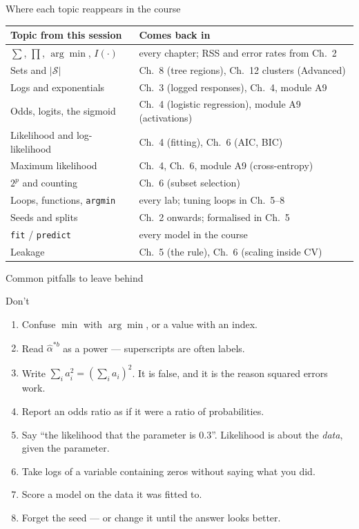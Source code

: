 \documentclass[aspectratio=169,11pt]{beamer}
\begin{document}
\begin{frame}{Where each topic reappears in the course}
  \footnotesize
  \begin{center}
  \begin{tabular}{@{}ll@{}}
    \toprule
    \textbf{Topic from this session} & \textbf{Comes back in} \\
    \midrule
    $\sum$, $\prod$, $\arg\min$, $I(\cdot)$ & every chapter; RSS and error rates from Ch.\ 2 \\
    Sets and $|\mathcal{S}|$ & Ch.\ 8 (tree regions), Ch.\ 12 clusters (Advanced) \\
    Logs and exponentials & Ch.\ 3 (logged responses), Ch.\ 4, module A9 \\
    Odds, logits, the sigmoid & Ch.\ 4 (logistic regression), module A9 (activations) \\
    Likelihood and log-likelihood & Ch.\ 4 (fitting), Ch.\ 6 (AIC, BIC) \\
    Maximum likelihood & Ch.\ 4, Ch.\ 6, module A9 (cross-entropy) \\
    $2^p$ and counting & Ch.\ 6 (subset selection) \\
    Loops, functions, \texttt{argmin} & every lab; tuning loops in Ch.\ 5--8 \\
    Seeds and splits & Ch.\ 2 onwards; formalised in Ch.\ 5 \\
    \texttt{fit} / \texttt{predict} & every model in the course \\
    Leakage & Ch.\ 5 (the rule), Ch.\ 6 (scaling inside CV) \\
    \bottomrule
  \end{tabular}
  \end{center}
\end{frame}

\begin{frame}{Common pitfalls to leave behind}
  \begin{alertblock}{Don't}
    \begin{enumerate}
      \item Confuse $\min$ with $\arg\min$, or a value with an index.
      \item Read $\hat\alpha^{*b}$ as a power --- superscripts are often labels.
      \item Write $\sum_i a_i^2 = (\sum_i a_i)^2$. It is false, and it is the
            reason squared errors work.
      \item Report an odds ratio as if it were a ratio of probabilities.
      \item Say ``the likelihood that the parameter is $0.3$''. Likelihood is
            about the \emph{data}, given the parameter.
      \item Take logs of a variable containing zeros without saying what you did.
      \item Score a model on the data it was fitted to.
      \item Forget the seed --- or change it until the answer looks better.
    \end{enumerate}
  \end{alertblock}
\end{frame}
\end{document}
